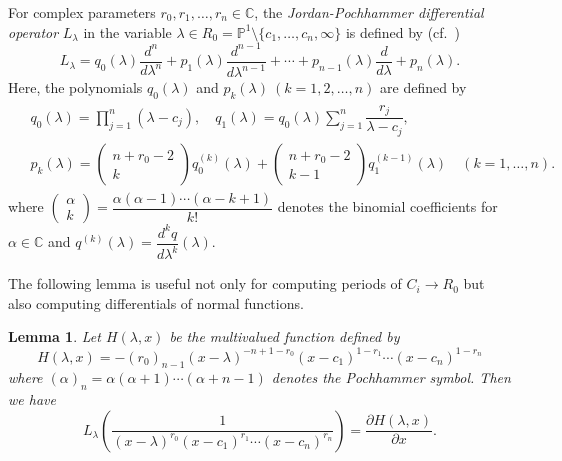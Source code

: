 \documentclass[letterpaper, 11pt]{amsart}
\theoremstyle{my theoremstyle}
\newtheorem{lem}[thm]{Lemma}
\theoremstyle{dfn}
\theoremstyle{remark}
\renewcommand{\1}{\mathbbm{1}}
\newcommand{\C}{\mathbb{C}}
\renewcommand{\P}{\mathbb{P}}
\renewcommand{\l}{\lambda}
\numberwithin{equation}{section}
\begin{document}
For complex parameters $r_0,r_1,\dots,r_n\in \C$, the \textit{Jordan-Pochhammer differential operator} $L_\l$ in the variable $\l\in R_0=\P^1 \setminus \{c_1,\dots,c_n,\infty\}$ is defined by (cf.~\cite[18.4]{Ince})
$$L_\l=q_0(\l) \dfrac{d^n}{d\l^n}+p_1(\l) \dfrac{d^{n-1}}{d\l^{n-1}}+\cdots + p_{n-1}(\l) \dfrac{d}{d\l}+p_n(\l). $$
Here, the polynomials $q_0(\l)$ and $p_k(\l)\:(k=1,2,\dots,n)$ are defined by 
\begin{align}
\begin{split} \label{Jordan-Pochhammer}
&q_0(\l)=\prod_{j=1}^n(\l-c_j), \quad  q_1(\l)= q_0(\l)  \sum_{j=1}^n \dfrac{r_j}{\l-c_j}, \\
& p_k(\l)=
\begin{pmatrix}
n+r_0-2 \\
k
\end{pmatrix}
q_0^{(k)}(\l)+ 
\begin{pmatrix}
n + r_0 -2 \\
k-1
\end{pmatrix}
q_1^{(k-1)}(\l) \quad (k=1, \ldots, n).  
\end{split}
\end{align}
where $\begin{pmatrix}
\alpha \\
k
\end{pmatrix} = \dfrac{\alpha(\alpha-1)\cdots (\alpha-k+1)}{k!}$ denotes the binomial coefficients for $\alpha\in\C$ and $q^{(k)}(\lambda)= \dfrac{d^kq}{d\lambda^k}(\lambda)$.

The following lemma is useful not only for computing periods of $C_i\to R_0$ but also computing differentials of normal functions.

\begin{lem} \label{potential}
Let $H(\l,x)$ be the multivalued function defined by
$$H(\l, x)= -(r_0)_{n-1} (x-\l)^{-n+1-r_0} (x-c_1)^{1-r_1} \cdots (x-c_n)^{1-r_n}$$
where $(\alpha)_n = \alpha(\alpha+1)\cdots (\alpha+n-1)$ denotes the Pochhammer symbol. 
Then we have 
$$L_\l\left(\dfrac1{(x-\l)^{r_0}(x-c_1)^{r_1} \cdots (x-c_n)^{r_n}}\right)= \dfrac{\partial H(\l,x)}{\partial x}. $$
\end{lem}
\end{document}
